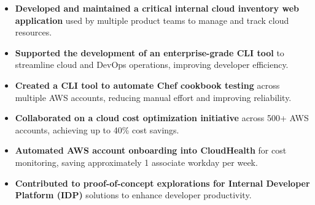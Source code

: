 \begin{itemize}
    \item \textbf{Developed and maintained a critical internal cloud inventory web application} used by multiple product teams to manage and track cloud resources.  
    \item \textbf{Supported the development of an enterprise-grade CLI tool} to streamline cloud and DevOps operations, improving developer efficiency.  
    \item \textbf{Created a CLI tool to automate Chef cookbook testing} across multiple AWS accounts, reducing manual effort and improving reliability.  
    \item \textbf{Collaborated on a cloud cost optimization initiative} across 500+ AWS accounts, achieving up to 40\% cost savings.  
    \item \textbf{Automated AWS account onboarding into CloudHealth} for cost monitoring, saving approximately 1 associate workday per week.  
    \item \textbf{Contributed to proof-of-concept explorations for Internal Developer Platform (IDP)} solutions to enhance developer productivity. 
\end{itemize}
